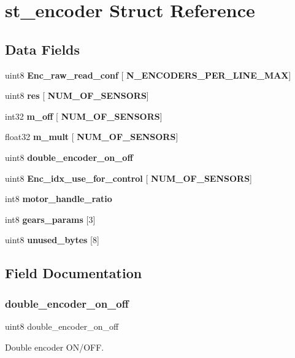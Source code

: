 \section{st\+\_\+encoder Struct Reference}
\label{structst__encoder}
\subsection*{Data Fields}
\begin{DoxyCompactItemize}
\item 
uint8 \textbf{ Enc\+\_\+raw\+\_\+read\+\_\+conf} [\textbf{ N\+\_\+\+E\+N\+C\+O\+D\+E\+R\+S\+\_\+\+P\+E\+R\+\_\+\+L\+I\+N\+E\+\_\+\+M\+AX}]
\item 
uint8 \textbf{ res} [\textbf{ N\+U\+M\+\_\+\+O\+F\+\_\+\+S\+E\+N\+S\+O\+RS}]
\item 
int32 \textbf{ m\+\_\+off} [\textbf{ N\+U\+M\+\_\+\+O\+F\+\_\+\+S\+E\+N\+S\+O\+RS}]
\item 
float32 \textbf{ m\+\_\+mult} [\textbf{ N\+U\+M\+\_\+\+O\+F\+\_\+\+S\+E\+N\+S\+O\+RS}]
\item 
uint8 \textbf{ double\+\_\+encoder\+\_\+on\+\_\+off}
\item 
uint8 \textbf{ Enc\+\_\+idx\+\_\+use\+\_\+for\+\_\+control} [\textbf{ N\+U\+M\+\_\+\+O\+F\+\_\+\+S\+E\+N\+S\+O\+RS}]
\item 
int8 \textbf{ motor\+\_\+handle\+\_\+ratio}
\item 
int8 \textbf{ gears\+\_\+params} [3]
\item 
uint8 \textbf{ unused\+\_\+bytes} [8]
\end{DoxyCompactItemize}


\subsection{Field Documentation}
\mbox{\label{structst__encoder_a3d5832272cab9dc9f831471a9634b43e}} 
\subsubsection{double\+\_\+encoder\+\_\+on\+\_\+off}
{\footnotesize\ttfamily uint8 double\+\_\+encoder\+\_\+on\+\_\+off}

Double encoder O\+N/\+O\+FF. \mbox{\label{structst__encoder_a300729112e37ceb3cddb32fa494d3465}} 
